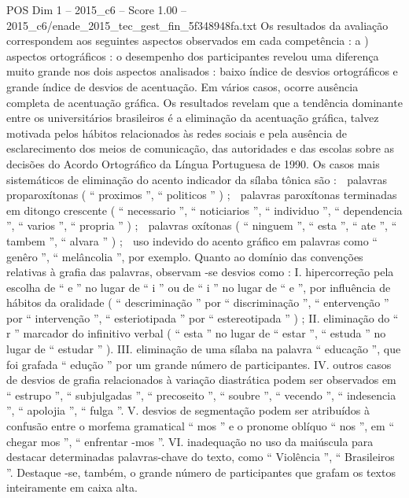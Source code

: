 \begin{textsample}{POS Dim 1 – 2015\_c6 – Score 1.00 – 2015\_c6/enade\_2015\_tec\_gest\_fin\_5f348948fa.txt}
Os resultados da avaliação correspondem aos seguintes aspectos observados em cada competência : a ) aspectos ortográficos : o desempenho dos participantes revelou uma diferença muito grande nos dois aspectos analisados : baixo índice de desvios ortográficos e grande índice de desvios de acentuação.
Em vários casos, ocorre ausência completa de acentuação gráfica.
Os resultados revelam que a tendência dominante entre os universitários brasileiros é a eliminação da acentuação gráfica, talvez motivada pelos hábitos relacionados às redes sociais e pela ausência de esclarecimento dos meios de comunicação, das autoridades e das escolas sobre as decisões do Acordo Ortográfico da Língua Portuguesa de 1990.
Os casos mais sistemáticos de eliminação do acento indicador da sílaba tônica são :  palavras proparoxítonas ( “ proximos ”, “ politicos ” ) ;  palavras paroxítonas terminadas em ditongo crescente ( “ necessario ”, “ noticiarios ”, “ individuo ”, “ dependencia ”, “ varios ”, “ propria ” ) ;  palavras oxítonas ( “ ninguem ”, “ esta ”, “ ate ”, “ tambem ”, “ alvara ” ) ;  uso indevido do acento gráfico em palavras como “ genêro ”, “ melâncolia ”, por exemplo.
Quanto ao domínio das convenções relativas à grafia das palavras, observam -se desvios como : I. hipercorreção pela escolha de “ e ” no lugar de “ i ” ou de “ i ” no lugar de “ e ”, por influência de hábitos da oralidade ( “ descriminação ” por “ discriminação ”, “ entervenção ” por “ intervenção ”, “ esteriotipada ” por “ estereotipada ” ) ; II. eliminação do “ r ” marcador do infinitivo verbal ( “ esta ” no lugar de “ estar ”, “ estuda ” no lugar de “ estudar ” ).
III. eliminação de uma sílaba na palavra “ educação ”, que foi grafada “ edução ” por um grande número de participantes.
IV. outros casos de desvios de grafia relacionados à variação diastrática podem ser observados em “ estrupo ”, “ subjulgadas ”, “ precoseito ”, “ soubre ”, “ vecendo ”, “ indesencia ”, “ apolojia ”, “ fulga ”.
V. desvios de segmentação podem ser atribuídos à confusão entre o morfema gramatical “ mos ” e o pronome oblíquo “ nos ”, em “ chegar mos ”, “ enfrentar -mos ”.
VI. inadequação no uso da maiúscula para destacar determinadas palavras-chave do texto, como “ Violência ”, “ Brasileiros ”.
Destaque -se, também, o grande número de participantes que grafam os textos inteiramente em caixa alta.

\end{textsample}
